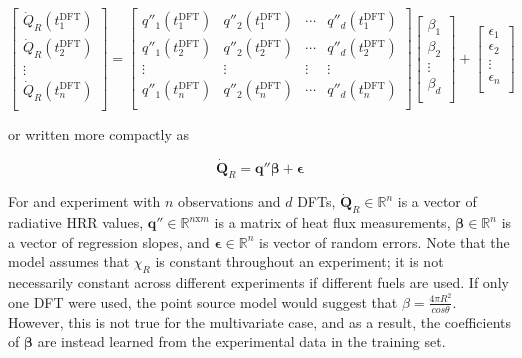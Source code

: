 \documentclass{article}
\begin{document}
 \begin{equation}
  \label{eqn:linear_model_expanded}
 \begin{bmatrix}
  \dot{Q}_{R}(t^{\text{DFT}}_1) \\ 
  \dot{Q}_{R}(t^{\text{DFT}}_2) \\ 
  \vdots \\
  \dot{Q}_{R}(t^{\text{DFT}}_n) \\ 
  \end{bmatrix} = \begin{bmatrix}
  q''_1(t^{\text{DFT}}_1) & q''_2(t^{\text{DFT}}_1) & \cdots & q''_d(t^{\text{DFT}}_1) \\ 
  q''_1(t^{\text{DFT}}_2) & q''_2(t^{\text{DFT}}_2) & \cdots & q''_d(t^{\text{DFT}}_2) \\ 
  \vdots & \vdots & \vdots & \vdots \\ 
  q''_1(t^{\text{DFT}}_n) & q''_2(t^{\text{DFT}}_n) & \cdots & q''_d(t^{\text{DFT}}_n) \\ 
  \end{bmatrix}
   \begin{bmatrix}
  \beta_1 \\ 
  \beta_2 \\ 
  \vdots \\
  \beta_d \\ 
  \end{bmatrix} +
    \begin{bmatrix}
  \epsilon_1 \\ 
  \epsilon_2 \\ 
  \vdots \\
  \epsilon_n \\ 
  \end{bmatrix}
\end{equation}

\noindent or written more compactly as 

 \begin{equation}
  \label{eqn:linear_model}
    \boldsymbol{\dot{Q}}_{R}  = \boldsymbol{q}'' \boldsymbol{\beta} + \boldsymbol{\epsilon}
\end{equation}

For and experiment with $n$ observations and $d$ DFTs, $\boldsymbol{\dot{Q}}_{R} \in  \mathbb{R}^n$ is a vector of radiative HRR values, $\boldsymbol{q}'' \in \mathbb{R}^{n\text{x}m}$ is a matrix of heat flux measurements, $\boldsymbol{\beta} \in \mathbb{R}^n$ is a vector of regression slopes, and $\boldsymbol{\epsilon} \in \mathbb{R}^n$ is vector of random errors. Note that the model assumes that $\chi_R$ is constant throughout an experiment; it is not necessarily constant across different experiments if different fuels are used. If only one DFT were used, the point source model would suggest that $\beta = \frac{4 \pi R^2}{ cos \theta}$. However, this is not true for the multivariate case, and as a result, the coefficients of $\boldsymbol{\beta}$ are instead learned from the experimental data in the training set.
\end{document}

